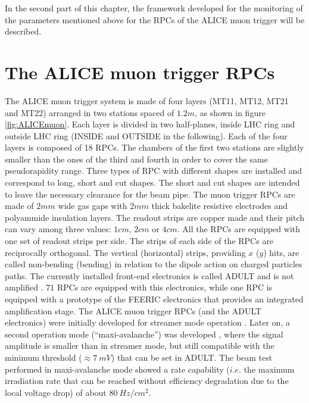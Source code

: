 
In the second part of this chapter, the framework developed for the monitoring of the parameters mentioned above for the RPCs of the ALICE muon trigger will be described.

\section{The ALICE muon trigger RPCs}
The ALICE muon trigger system is made of four layers (MT11, MT12, MT21 and MT22) arranged in two stations spaced of $1.2m$, as shown in figure \ref{fig:ALICEmuon}.
Each layer is divided in two half-planes, inside LHC ring and outside LHC ring (INSIDE and OUTSIDE in the following).
Each of the four layers is composed of 18 RPCs.
The chambers of the first two stations are slightly smaller than the ones of the third and fourth in order to cover the same pseudorapidity range.
Three types of RPC with different shapes are installed and correspond to long, short and cut shapes.
The short and cut shapes are intended to leave the necessary clearance for the beam pipe.
The muon trigger RPCs are made of $2mm$ wide gas gaps with $2mm$ thick bakelite resistive electrodes and polyammide insulation layers.
The readout strips are copper made and their pitch can vary among three values: $1cm$, $2cm$ or $4cm$.
All the RPCs are equipped with one set of readout strips per side.
The strips of each side of the RPCs are reciprocally orthogonal.
The vertical (horizontal) strips, providing $x$ ($y$) hits, are called non-bending (bending) in relation to the dipole action on charged particles paths.
The currently installed front-end electronics is called ADULT and is not amplified \cite{Dupieux:2003bw}.
71 RPCs are equipped with this electronics, while one RPC is equipped with a prototype of the FEERIC electronics \cite{Marchisone:2017bcb} that provides an integrated amplification stage.
The ALICE muon trigger RPCs (and the ADULT electronics) were initially developed for streamer mode operation \cite{Arnaldi:2000ub}. 
Later on, a second operation mode (“maxi-avalanche”) was developed \cite{Arnaldi:2006ii}, where the signal amplitude is smaller than in streamer mode, but still compatible with the minimum threshold ($\approx7\ mV$) that can be set in ADULT. 
The beam test performed in maxi-avalanche mode showed a rate capability ($i.e.$ the maximum irradiation rate that can be reached without efficiency degradation due to the local voltage drop) of about $80\ Hz/cm^2$. 
